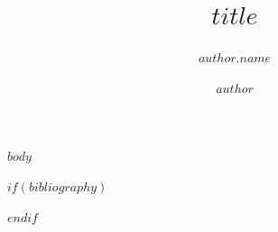 \documentclass[man]{apa7}
\title{$title$}
\author{$author.name$}
\author{$author$}
\begin{document}
\maketitle

$body$

$if(bibliography)$


$endif$
\end{document}
